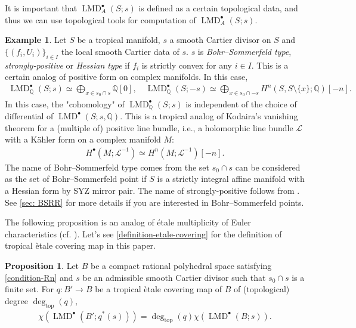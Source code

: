 \documentclass[a4paper,dvipdfmx,reqno,12pt]{amsart}
\theoremstyle{definition}
\newtheorem{example}[theorem]{Example}
\newtheorem{proposition}[theorem]{Proposition}
\newcommand{\Q}{\mathbb{Q}}%
\newcommand{\mcal}[1]{\mathcal{#1}}%
\newcommand{\opn}[1]{\operatorname{#1}}
\numberwithin{equation}{section}
\begin{document}
It is important that $\opn{LMD}^{\bullet}_{A}(S;s)$ is
defined as a certain topological data, and thus
we can use topological tools for computation of 
$\opn{LMD}^{\bullet}_{A}(S;s)$.

\begin{example}
\label{example-tropical-kodaira-vanishing}
Let $S$ be a tropical manifold, 
$s$ a smooth Cartier divisor on $S$ 
and $\{(f_i,U_i)\}_{i\in I}$ the local smooth 
Cartier data of $s$. 
$s$ is 
\emph{Bohr--Sommerfeld type},
\emph{strongly-positive}
or \emph{Hessian type} if
$f_i$ is strictly convex for any $i\in I$. 
This is a certain analog of positive form on
complex manifolds. In this case, 
\begin{align}
\opn{LMD}^{\bullet}_{\mathbb{Q}}(S;s)\simeq 
\bigoplus_{x\in s_0 \cap s} \Q[0], \quad
\opn{LMD}^{\bullet}_{\mathbb{Q}}(S;-s)\simeq 
\bigoplus_{x\in s_0\cap -s} 
H^{n}(S,S\setminus\{x\};\mathbb{Q})[-n].
\end{align}
In this case, the "cohomology" of 
$\opn{LMD}^{\bullet}_{\mathbb{Q}}(S;s)$ is independent of the choice of 
differential of $\opn{LMD}^{\bullet}(S;s,\Q)$.
This is a tropical analog of Kodaira's vanishing theorem
for a (multiple of) positive line bundle, i.e., a holomorphic line bundle $\mcal{L}$ with a 
K\"ahler form on a complex manifold $M$: 
\begin{align}
H^{\bullet}(M;\mcal{L}^{-1})\simeq H^{n}(M;\mcal{L}^{-1})[-n].
\end{align}
The name of Bohr--Sommerfeld type comes from 
the set $s_0\cap s$ can be considered as the set of 
Bohr--Sommerfeld point if $S$ is a strictly integral affine manifold 
with a Hessian form by SYZ mirror pair.
The name of strongly-positive follows 
from \cite{MR2892935}.
See \cref{sec: BSRR} for more details if 
you are interested in Bohr--Sommerfeld points.
\end{example}

The following proposition is an analog of \'{e}tale multiplicity of Euler characteristics
(cf. \cite[Proposition 1.1.28]{MR2095471}).
Let's see \cref{definition-etale-covering} for 
the definition of tropical \`etale covering 
map in this paper.
\begin{proposition}
\label{proposition-euler-number-etale}
Let $B$ be a compact rational polyhedral space satisfying
\cref{condition-Rn} and $s$ be an admissible smooth Cartier divisor
such that $s_0\cap s$ is a finite set.
For $q \colon B' \to B$ be a tropical \`etale covering 
map of $B$ of 
(topological) degree 
$\opn{deg}_{\opn{top}}(q)$,
\begin{align}
\chi(\opn{LMD}^{\bullet}(B';q^{*}(s)))=
\opn{deg}_{\opn{top}}(q)\chi(\opn{LMD}^{\bullet}(B;s)).
\end{align}
\end{proposition}
\end{document}
